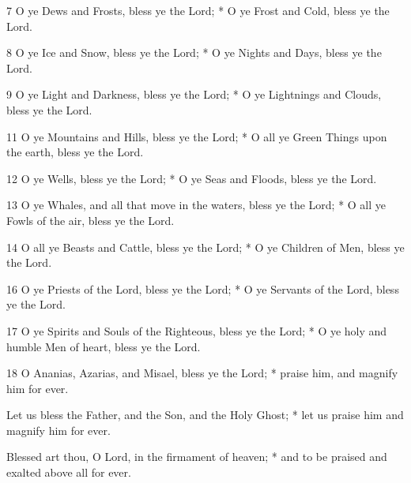 7 O ye Dews and Frosts, bless ye the Lord; * O ye Frost and Cold, bless ye the Lord.

8 O ye Ice and Snow, bless ye the Lord; * O ye Nights and Days, bless ye the Lord.

9 O ye Light and Darkness, bless ye the Lord; * O ye Lightnings and Clouds, bless ye the Lord.


11 O ye Mountains and Hills, bless ye the Lord; * O all ye Green Things upon the earth, bless ye the Lord.

12 O ye Wells, bless ye the Lord; * O ye Seas and Floods, bless ye the Lord.

13 O ye Whales, and all that move in the waters, bless ye the Lord; * O all ye Fowls of the air, bless ye the Lord.

14 O all ye Beasts and Cattle, bless ye the Lord; * O ye Children of Men, bless ye the Lord.


16 O ye Priests of the Lord, bless ye the Lord; * O ye Servants of the Lord, bless ye the Lord.

17 O ye Spirits and Souls of the Righteous, bless ye the Lord; * O ye holy and humble Men of heart, bless ye the Lord.

18 O Ananias, Azarias, and Misael, bless ye the Lord; * praise him, and magnify him for ever.

Let us bless the Father, and the Son, and the Holy Ghost; * let us praise him and magnify him for ever.

Blessed art thou, O Lord, in the firmament of heaven; * and to be praised and exalted above all for ever.


\medskip


{\centering\footnotesize{\par}}



